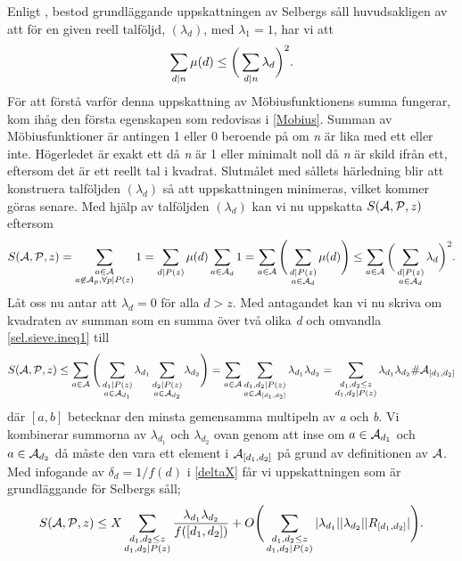 Enligt \cite[s. 114]{cojocarumurty}, bestod grundläggande uppskattningen av Selbergs såll huvudsakligen av att för en given reell talföljd, \((\lambda_d)\), med \(\lambda_1 = 1\), har vi att 
\begin{equation}
    \sum_{d\divides n}\mu(d) \leq \bigg(\sum_{d\divides n}\lambda_d\bigg)^2.\nonumber
\end{equation}
För att förstå varför denna uppskattning av Möbiusfunktionens summa fungerar, kom ihåg den första egenskapen som redovisas i \ref{Mobius}. 
Summan av Möbiusfunktioner är antingen 1 eller 0 beroende på om \textit{n} är lika med ett eller inte.
Högerledet är exakt ett då \textit{n} är 1 eller minimalt noll då \textit{n} är skild ifrån ett, eftersom det är ett reellt tal i kvadrat.
Slutmålet med sållets härledning blir att konstruera talföljden \((\lambda_d)\) så att uppskattningen minimeras, vilket kommer göras senare.
Med hjälp av talföljden \((\lambda_d)\) kan vi nu uppskatta \(\S{A}{P}{z}\) eftersom
\begin{equation}
\S{A}{P}{z} = \sum_{\substack{a\in \mathcal{A}\\a\not\in\mathcal{A}_p,\forall p\divides P(z)}} 1 = \sum_{d\divides P(z)} \mu(d) \sum_{a\in\mathcal{A}_d}1 = \sum_{a\in \A} \Bigg(\sum_{\substack{d\divides P(z)\\a\in \A_d}}\mu(d)\Bigg)\leq \sum_{a\in \A}\bigg(\sum_{\substack{d\divides P(z)\\a\in \A_d}}\lambda_d\bigg)^2.\label{sel.sieve.ineq1}
\end{equation}
Låt oss nu antar att \(\lambda_d = 0\) för alla \(d > z\). Med antagandet kan vi nu skriva om kvadraten av summan som en summa över två olika \textit{d} och omvandla \eqref{sel.sieve.ineq1} till
\begin{equation}
    \S{A}{P}{z} \leq \sum_{a\in \A}\Bigg(\sum_{\substack{d_1\divides P(z)\\a\in \A_{d_1}}}\lambda_{d_1}\sum_{\substack{d_2\divides P(z)\\a\in \A_{d_2}}}\lambda_{d_2}\Bigg)  =  \sum_{a\in \A}\sum_{\substack{d_1,d_2\divides P(z)\\a\in \A_{[d_1,d_2]}}}\lambda_{d_1}\lambda_{d_2} = \sum_{\substack{d_1,d_2\leq z\\d_1,d_2\divides P(z)}}\lambda_{d_1}\lambda_{d_2}\#\A_{[d_1, d_2]}\nonumber
\end{equation}
där \([a, b]\) betecknar den minsta gemensamma multipeln av \textit{a} och \textit{b}. 
Vi kombinerar summorna av \(\lambda_{d_1}\) och \(\lambda_{d_2}\) ovan genom att inse om \(a\in\A_{d_1}\) och \(a\in\A_{d_2}\) då måste den vara ett element i \(\A_{[d_1,d_2]}\) på grund av definitionen av \(\A\).
Med infogande av \(\delta_d = 1/f(d)\) i \eqref{deltaX} får vi uppskattningen som är grundläggande för Selbergs såll;
\begin{equation}
    \S{A}{P}{z} \leq X\sum_{\substack{d_1,d_2\leq z\\d_1,d_2\divides P(z)}}\frac{\lambda_{d_1}\lambda_{d_2}}{f([d_1,d_2])} + O\Bigg(\sum_{\substack{d_1,d_2\leq z\\d_1,d_2\divides P(z)}}|\lambda_{d_1}||\lambda_{d_2}||R_{[d_1, d_2]}|\Bigg)\label{sel.sieve.main}.
\end{equation}

